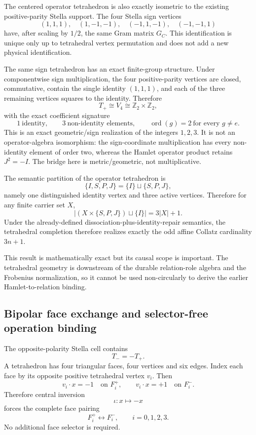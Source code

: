 \documentclass[11pt]{article}
\begin{document}
The centered operator tetrahedron is also exactly isometric to the existing
positive-parity Stella support. The four Stella sign vertices
\[
(1,1,1),\quad
(1,-1,-1),\quad
(-1,1,-1),\quad
(-1,-1,1)
\]
have, after scaling by \(1/2\), the same Gram matrix \(G_C\). This
identification is unique only up to tetrahedral vertex permutation and does not
add a new physical identification.

The same sign tetrahedron has an exact finite-group structure. Under
componentwise sign multiplication, the four positive-parity vertices are closed,
commutative, contain the single identity \((1,1,1)\), and each of the three
remaining vertices squares to the identity. Therefore
\[
\boxed{
T_+\cong V_4\cong\mathbb Z_2\times\mathbb Z_2,
}
\]
with the exact coefficient signature
\[
\boxed{
1\ \text{identity},\qquad
3\ \text{non-identity elements},\qquad
\operatorname{ord}(g)=2\ \text{for every }g\ne e.
}
\]
This is an exact geometric/sign realization of the integers \(1,2,3\).
It is not an operator-algebra isomorphism: the sign-coordinate multiplication
has every non-identity element of order two, whereas the Hamlet operator product
retains \(J^2=-I\). The bridge here is metric/geometric, not multiplicative.

The semantic partition of the operator tetrahedron is
\[
\boxed{
\{I,S,P,J\}
=
\{I\}
\sqcup
\{S,P,J\},
}
\]
namely one distinguished identity vertex and three active vertices. Therefore
for any finite carrier set \(X\),
\[
\boxed{
\left|
(X\times\{S,P,J\})\sqcup\{I\}
\right|
=
3|X|+1.
}
\]
Under the already-defined dissociation-plus-identity-repair semantics, the
tetrahedral completion therefore realizes exactly the odd affine Collatz
cardinality \(3n+1\).

This result is mathematically exact but its causal scope is important. The
tetrahedral geometry is downstream of the durable relation-role algebra and
the Frobenius normalization, so it cannot be used non-circularly to derive the
earlier Hamlet-to-relation binding.

\subsection{Bipolar face exchange and selector-free operation binding}

The opposite-polarity Stella cell contains
\[
T_-=-T_+.
\]
A tetrahedron has four triangular faces, four vertices and six edges. Index
each face by its opposite positive tetrahedral vertex \(v_i\). Then
\[
v_i\cdot x=-1
\quad\text{on }F_i^+,
\qquad
v_i\cdot x=+1
\quad\text{on }F_i^-.
\]
Therefore central inversion
\[
\iota:x\mapsto-x
\]
forces the complete face pairing
\[
\boxed{
F_i^+\longleftrightarrow F_i^-,
\qquad i=0,1,2,3.
}
\]
No additional face selector is required.
\end{document}
